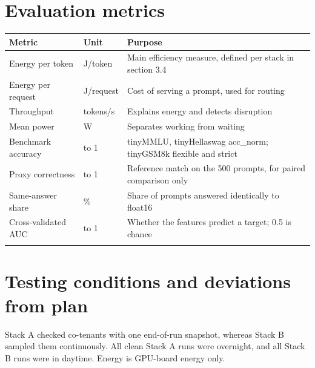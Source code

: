 \section{Evaluation metrics}

\begingroup\footnotesize\setlength{\tabcolsep}{4pt}
\begin{longtable}{>{\raggedright\arraybackslash}p{50.8mm}>{\raggedright\arraybackslash}p{26.2mm}>{\raggedright\arraybackslash}p{64.6mm}}
\toprule
\textbf{Metric} & \textbf{Unit} & \textbf{Purpose} \\
\midrule
\endhead
Energy per token & J/token & Main efficiency measure, defined per stack in section 3.4 \\*
Energy per request & J/request & Cost of serving a prompt, used for routing \\*
Throughput & tokens/s & Explains energy and detects disruption \\*
Mean power & W & Separates working from waiting \\*
Benchmark accuracy & 0 to 1 & tinyMMLU, tinyHellaswag acc\_\allowbreak{}norm; tinyGSM8k flexible and strict \\*
Proxy correctness & 0 to 1 & Reference match on the 500 prompts, for paired comparison only \\*
Same-answer share & \% & Share of prompts answered identically to float16 \\*
Cross-validated AUC & 0 to 1 & Whether the features predict a target; 0.5 is chance \\*
\bottomrule\noalign{\nobreak}
\end{longtable}
\addtocounter{table}{-1}
\endgroup

\section{Testing conditions and deviations from plan}
Stack A checked co-tenants with one end-of-run snapshot, whereas Stack B sampled them continuously. All clean Stack A runs were overnight, and all Stack B runs were in daytime. Energy is GPU-board energy only.


